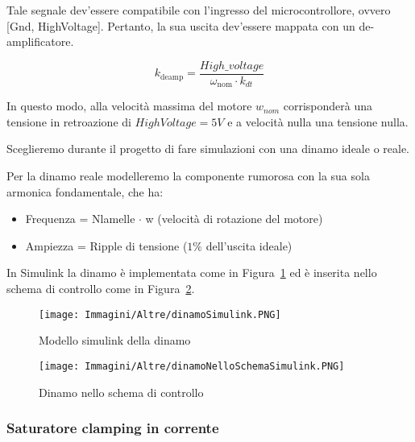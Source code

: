 \documentclass[a4paper,12pt]{article}
\begin{document}
Tale segnale dev'essere compatibile con l'ingresso del microcontrollore, ovvero [Gnd, HighVoltage]. Pertanto, la sua uscita dev'essere mappata con un de-amplificatore.

\[
    k_{\text{deamp}} = \frac{High\_voltage}{\omega_{\text{nom}} \cdot k_{dt}}
\]

\vspace{0.3cm}

In questo modo, alla velocità massima del motore $w_{nom}$ corrisponderà una tensione in retroazione di $HighVoltage = 5V$ e a velocità nulla una tensione nulla.

\vspace{0.5cm}
 
Sceglieremo durante il progetto di fare simulazioni con una dinamo ideale o reale.

Per la dinamo reale modelleremo la componente rumorosa con la sua sola armonica fondamentale, che ha: 

\begin{itemize}
    \item Frequenza = Nlamelle $\cdot$ w (velocità di rotazione del motore)
    \item Ampiezza = Ripple di tensione ($1\%$ dell'uscita ideale)
\end{itemize}

\vspace{0.5cm}

In Simulink la dinamo è implementata come in Figura~\ref{fig:simulink_dinamo} ed è inserita nello schema di controllo come in Figura~\ref{fig:simulink_controllo_dinamo}.

\begin{figure}[h!]
\centering
    \texttt{[image: Immagini/Altre/dinamoSimulink.PNG]}
    \caption{Modello simulink della dinamo}
    \label{fig:simulink_dinamo}
\end{figure}

\begin{figure}[h!]
\centering
    \texttt{[image: Immagini/Altre/dinamoNelloSchemaSimulink.PNG]}
    \caption{Dinamo nello schema di controllo}
    \label{fig:simulink_controllo_dinamo}
\end{figure}


\vspace{0.5cm}

\subsubsection{Saturatore clamping in corrente}
\end{document}
